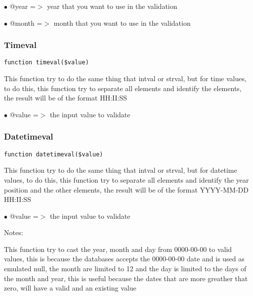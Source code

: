 \documentclass[a4paper]{article}
\begin{document}
\begin{compactitem}
\item[\color{myblue}$\bullet$] @year  =$>$ year that you want to use in the validation
\item[\color{myblue}$\bullet$] @month =$>$ month that you want to use in the validation
\end{compactitem}

\hypertarget{toc104}{}
\subsubsection{Timeval}

\begin{lstlisting}
function timeval($value)
\end{lstlisting}

This function try to do the same thing that intval or strval, but for time
values, to do this, this function try to separate all elements and identify
the elements, the result will be of the format HH:II:SS

\begin{compactitem}
\item[\color{myblue}$\bullet$] @value =$>$ the input value to validate
\end{compactitem}

\hypertarget{toc105}{}
\subsubsection{Datetimeval}

\begin{lstlisting}
function datetimeval($value)
\end{lstlisting}

This function try to do the same thing that intval or strval, but for datetime
values, to do this, this function try to separate all elements and identify
the year position and the other elements, the result will be of the format
YYYY-MM-DD HH:II:SS

\begin{compactitem}
\item[\color{myblue}$\bullet$] @value =$>$ the input value to validate
\end{compactitem}

Notes:

This function try to cast the year, month and day from 0000-00-00 to valid
values, this is because the databases accepts the 0000-00-00 date and is used
as emulated null, the month are limited to 12 and the day is limited to the
days of the month and year, this is useful because the dates that are more
greather that zero, will have a valid and an existing value
\end{document}
